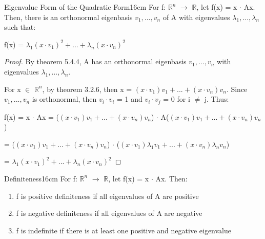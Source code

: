     \vspace{0.5cm}



    \begin{wtheorem}{Eigenvalue Form of the Quadratic Form}{16cm}
        For f: $\mathbb{R}^n$ $\rightarrow$ $\mathbb{R}$,
        let f(x) = x $\cdot$ Ax. Then, there is an orthonormal eigenbasis
        $v_1,...,v_n$ of A with eigenvalues $\lambda_1,...,\lambda_n$ such that:

        \hspace{0.5cm}
        f(x) = $\lambda_1(x \cdot v_1)^2 + ... + \lambda_n(x \cdot v_n)^2$
    \end{wtheorem}

    \begin{proof}
        By {\color{red} theorem 5.4.4}, A has an orthonormal eigenbasis
        $v_1,...,v_n$ with eigenvalues $\lambda_1,...,\lambda_n$.
        
        For x $\in$ $\mathbb{R}^n$, by {\color{red} theorem 3.2.6},
        then x = $(x \cdot v_1)v_1 + ... + (x \cdot v_n)v_n$.
        Since $v_1,...,v_n$ is orthonormal, then $v_i \cdot v_i$ = 1
        and $v_i \cdot v_j$ = 0 for i $\not =$ j. Thus:

        \hspace{0.5cm}
        f(x) = x $\cdot$ Ax
        = ($(x \cdot v_1)v_1 + ... + (x \cdot v_n)v_n$)
            $\cdot$ A($(x \cdot v_1)v_1 + ... + (x \cdot v_n)v_n$)

        \hspace{1.3cm}
        = ($(x \cdot v_1)v_1 + ... + (x \cdot v_n)v_n$)
            $\cdot$ ($(x \cdot v_1)\lambda_1v_1 +...+ (x \cdot v_n)\lambda_nv_n$)

        \hspace{1.3cm}
        = $\lambda_1(x \cdot v_1)^2 + ... + \lambda_n(x \cdot v_n)^2$
    \end{proof}

    \vspace{0.5cm}



    \begin{definition}{Definiteness}{16cm}
        For f: $\mathbb{R}^n$ $\rightarrow$ $\mathbb{R}$,
        let f(x) = x $\cdot$ Ax. Then:

        \begin{enumerate}[label=(\alph*), leftmargin=1cm, itemsep=0.1cm]
            \item f is {\color{lgreen} positive definiteness} if all
                eigenvalues of A are positive

            \item f is {\color{lgreen} negative definiteness} if all
                eigenvalues of A are negative

            \item f is {\color{lgreen} indefinite} if there is at least one
                positive and negative eigenvalue
        \end{enumerate}
    \end{definition}




